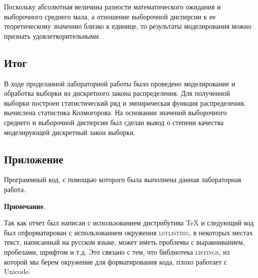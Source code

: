 \documentclass[a4paper, 14pt]{extarticle}
\begin{document}
Поскольку абсолютная величина разности математического ожидания 
и выборочного среднего мала, а отношение выборочной 
дисперсии к ее теоретическому значению близко к единице, то 
результаты моделирования можно признать удовлетворительными.

\subsection*{Итог}

В ходе проделанной лабораторной работы было проведено моделирование 
и обработка выборки из дискретного закона распределения. Для полученной 
выборки построен статистический ряд и эмпирическая функция распределения, 
вычислена статистика Колмогорова. На основании значений выборочного среднего 
и выборочной дисперсии был сделан вывод о степени качества моделирующей дискретный 
закон выборки.


\subsection*{Приложение}

Программный код, с помощью которого была выполнена данная лабораторная работа.\\

\vspace{15pt}

{\footnotesize
\noindent \textbf{Примечание}.\\

\vspace{-10pt}

\noindent Так как отчет был написан с использованием дистрибутива TeX и 
следующий код был отформатирован с использованием окружения \textsc{lstlisting}, 
в некоторых местах текст, написанный на русском языке, может иметь проблемы 
с выравниванием, пробелами, шрифтом и т.д. Это связано с тем, что библиотека 
\textsc{listings}, из которой мы берем окружение для форматирования кода, 
плохо работает с Unicode.
}

\vspace{20pt}


\end{document}
